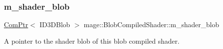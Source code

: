 \subsubsection{\texorpdfstring{m\+\_\+shader\+\_\+blob}{m\_shader\_blob}}
{\footnotesize\ttfamily \hyperlink{namespacemage_ae74f374780900893caa5555d1031fd79}{Com\+Ptr}$<$ I\+D3\+D\+Blob $>$ mage\+::\+Blob\+Compiled\+Shader\+::m\+\_\+shader\+\_\+blob\hspace{0.3cm}{\ttfamily [private]}}

A pointer to the shader blob of this blob compiled shader. 